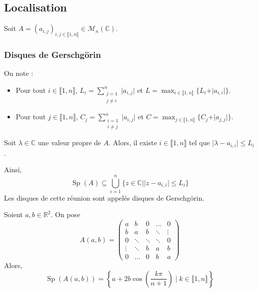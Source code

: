 	\subsection{Localisation}
	
	Soit $A = (a_{i,j})_{i, j \in \llbracket 1, n \rrbracket} \in \mathcal{M}_n(\mathbb{C})$.
	
	\subsubsection{Disques de Gerschgörin}
	
	
	\begin{notation}
		On note :
		\begin{itemize}
			\item Pour tout $i \in \llbracket 1, n \rrbracket$, $L_i = \sum_{\substack{j=1 \\ j \neq i}}^n \vert a_{i,j} \vert$ et $L = \max_{i \in \llbracket 1, n \rrbracket} \{ L_i + \vert a_{i,i} \vert \}$.
			\item Pour tout $j \in \llbracket 1, n \rrbracket$, $C_j = \sum_{\substack{i=1 \\ i \neq j}}^n \vert a_{i,j} \vert$ et $C = \max_{j \in \llbracket 1, n \rrbracket} \{ C_j + \vert a_{j,j} \vert \}$.
		\end{itemize}
	\end{notation}
	
	\begin{theorem}
		\label{153-1}
		Soit $\lambda \in \mathbb{C}$ une valeur propre de $A$. Alors, il existe $i \in \llbracket 1, n \rrbracket$ tel que $\vert \lambda - a_{i,i} \vert \leq L_i$.
	\end{theorem}
	
	
	\begin{remark}
		Ainsi,
		\[ \operatorname{Sp}(A) \subseteq \bigcup_{i=1}^n \{ z \in \mathbb{C} \mid \vert z - a_{i,i} \vert \leq L_i \} \]
		Les disques de cette réunion sont appelés disques de Gerschgörin.
	\end{remark}
	
	
	\begin{example}
		Soient $a, b \in \mathbb{R}^2$. On pose
		\[
			A(a,b) =
		 	\begin{pmatrix}
		 		a & b & 0 & \dots & 0 \\
		 		b & a & b & \ddots & \vdots \\
		 		0 & \ddots & \ddots & \ddots & 0 \\
		 		\vdots & \ddots & b & a & b \\
		 		0 & \dots & 0 & b & a
		 	\end{pmatrix}
		 \]
		 Alors,
		 \[ \operatorname{Sp}(A(a,b)) = \left\{ a + 2b \cos \left( \frac{k \pi}{n+1} \right) \mid k \in \llbracket 1, n \rrbracket \right\} \]
	\end{example}
	
